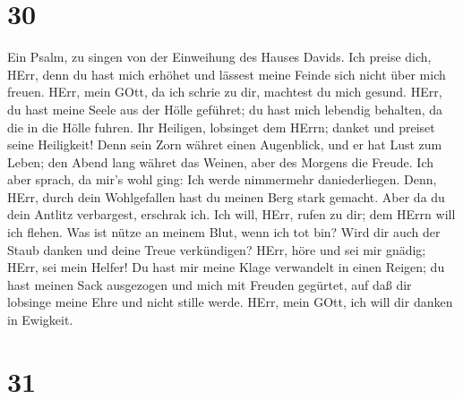 \hypertarget{section-29}{%
\section{30}\label{section-29}}

 Ein Psalm, zu singen von der Einweihung des Hauses Davids.
 Ich preise dich, HErr, denn du hast mich erhöhet und
lässest meine Feinde sich nicht über mich freuen.  HErr,
mein GOtt, da ich schrie zu dir, machtest du mich gesund. 
HErr, du hast meine Seele aus der Hölle geführet; du hast mich lebendig
behalten, da die in die Hölle fuhren.  Ihr Heiligen,
lobsinget dem HErrn; danket und preiset seine Heiligkeit! 
Denn sein Zorn währet einen Augenblick, und er hat Lust zum Leben; den
Abend lang währet das Weinen, aber des Morgens die Freude. 
Ich aber sprach, da mir's wohl ging: Ich werde nimmermehr
daniederliegen.  Denn, HErr, durch dein Wohlgefallen hast du
meinen Berg stark gemacht. Aber da du dein Antlitz verbargest, erschrak
ich.  Ich will, HErr, rufen zu dir; dem HErrn will ich
flehen.  Was ist nütze an meinem Blut, wenn ich tot bin?
Wird dir auch der Staub danken und deine Treue verkündigen?
 HErr, höre und sei mir gnädig; HErr, sei mein Helfer!
 Du hast mir meine Klage verwandelt in einen Reigen; du
hast meinen Sack ausgezogen und mich mit Freuden gegürtet, 
auf daß dir lobsinge meine Ehre und nicht stille werde. HErr, mein GOtt,
ich will dir danken in Ewigkeit.

\hypertarget{section-30}{%
\section{31}\label{section-30}}


